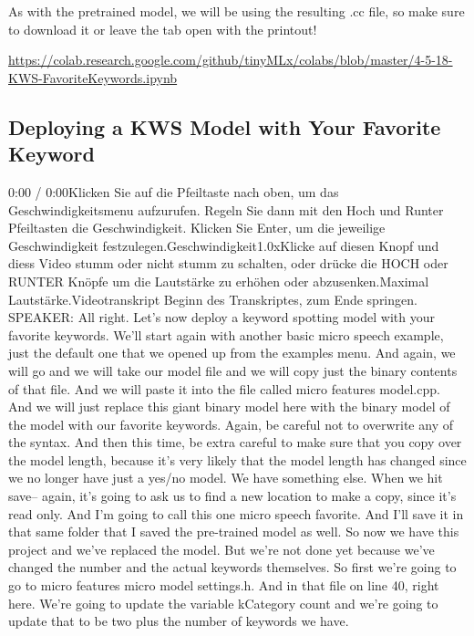     As with the pretrained model, we will be using the resulting .cc file, so make sure to download it or leave the tab open with the printout!
    
    \url{https://colab.research.google.com/github/tinyMLx/colabs/blob/master/4-5-18-KWS-FavoriteKeywords.ipynb}
    
    
\subsection{Deploying a KWS Model with Your Favorite Keyword}

    0:00 / 0:00Klicken Sie auf die Pfeiltaste nach oben, um das Geschwindigkeitsmenu aufzurufen. Regeln Sie dann mit den Hoch und Runter Pfeiltasten die Geschwindigkeit. Klicken Sie Enter, um die jeweilige Geschwindigkeit festzulegen.Geschwindigkeit1.0xKlicke auf diesen Knopf und diess Video stumm oder nicht stumm zu schalten, oder drücke die HOCH oder RUNTER Knöpfe um die Lautstärke zu erhöhen oder abzusenken.Maximal Lautstärke.Videotranskript
    Beginn des Transkriptes, zum Ende springen.
    SPEAKER: All right.
    Let's now deploy a keyword spotting model with your favorite keywords.
    We'll start again with another basic micro speech example, just
    the default one that we opened up from the examples menu.
    And again, we will go and we will take our model file
    and we will copy just the binary contents of that file.
    And we will paste it into the file called micro features model.cpp.
    And we will just replace this giant binary model here
    with the binary model of the model with our favorite keywords.
    Again, be careful not to overwrite any of the syntax.
    And then this time, be extra careful to make sure
    that you copy over the model length, because it's
    very likely that the model length has changed since we no longer have
    just a yes/no model.
    We have something else.
    When we hit save-- again, it's going to ask us to find a new location
    to make a copy, since it's read only.
    And I'm going to call this one micro speech favorite.
    And I'll save it in that same folder that I
    saved the pre-trained model as well.
    So now we have this project and we've replaced the model.
    But we're not done yet because we've changed
    the number and the actual keywords themselves.
    So first we're going to go to micro features micro model settings.h.
    And in that file on line 40, right here.
    We're going to update the variable kCategory count
    and we're going to update that to be two plus the number of keywords we have.

